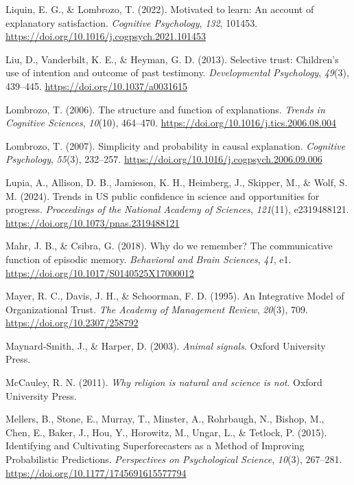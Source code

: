 \documentclass[
  jou,
  floatsintext,
  longtable,
  nolmodern,
  notxfonts,
  notimes,
  colorlinks=true,linkcolor=blue,citecolor=blue,urlcolor=blue]{apa7}
\newlength{\cslhangindent}
\newenvironment{CSLReferences}[2] %
 {\begin{list}{}{%
  \setlength{\itemindent}{0pt}
  \setlength{\leftmargin}{0pt}
  \setlength{\parsep}{0pt}
  \ifodd #1
   \setlength{\leftmargin}{\cslhangindent}
   \setlength{\itemindent}{-1\cslhangindent}
  \fi
  \setlength{\itemsep}{#2\baselineskip}}}
 {\end{list}}
\begin{document}
\begin{CSLReferences}{1}{0}
Liquin, E. G., \& Lombrozo, T. (2022). Motivated to learn: An account of
explanatory satisfaction. \emph{Cognitive Psychology}, \emph{132},
101453. \url{https://doi.org/10.1016/j.cogpsych.2021.101453}

Liu, D., Vanderbilt, K. E., \& Heyman, G. D. (2013). Selective trust:
Children's use of intention and outcome of past testimony.
\emph{Developmental Psychology}, \emph{49}(3), 439--445.
\url{https://doi.org/10.1037/a0031615}

Lombrozo, T. (2006). The structure and function of explanations.
\emph{Trends in Cognitive Sciences}, \emph{10}(10), 464--470.
\url{https://doi.org/10.1016/j.tics.2006.08.004}

Lombrozo, T. (2007). Simplicity and probability in causal explanation.
\emph{Cognitive Psychology}, \emph{55}(3), 232--257.
\url{https://doi.org/10.1016/j.cogpsych.2006.09.006}

Lupia, A., Allison, D. B., Jamieson, K. H., Heimberg, J., Skipper, M.,
\& Wolf, S. M. (2024). Trends in US public confidence in science and
opportunities for progress. \emph{Proceedings of the National Academy of
Sciences}, \emph{121}(11), e2319488121.
\url{https://doi.org/10.1073/pnas.2319488121}

Mahr, J. B., \& Csibra, G. (2018). Why do we remember? The communicative
function of episodic memory. \emph{Behavioral and Brain Sciences},
\emph{41}, e1. \url{https://doi.org/10.1017/S0140525X17000012}

Mayer, R. C., Davis, J. H., \& Schoorman, F. D. (1995). An Integrative
Model of Organizational Trust. \emph{The Academy of Management Review},
\emph{20}(3), 709. \url{https://doi.org/10.2307/258792}

Maynard-Smith, J., \& Harper, D. (2003). \emph{Animal signals}. Oxford
University Press.

McCauley, R. N. (2011). \emph{Why religion is natural and science is
not}. Oxford University Press.

Mellers, B., Stone, E., Murray, T., Minster, A., Rohrbaugh, N., Bishop,
M., Chen, E., Baker, J., Hou, Y., Horowitz, M., Ungar, L., \& Tetlock,
P. (2015). Identifying and Cultivating Superforecasters as a Method of
Improving Probabilistic Predictions. \emph{Perspectives on Psychological
Science}, \emph{10}(3), 267--281.
\url{https://doi.org/10.1177/1745691615577794}


\end{CSLReferences}
\end{document}
